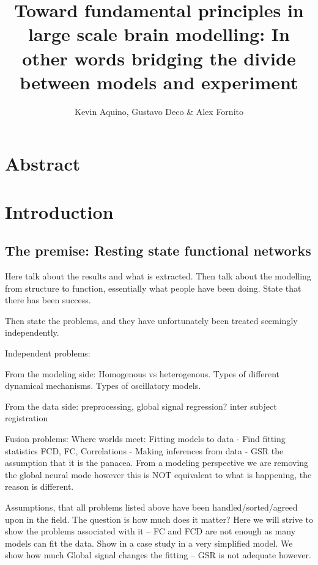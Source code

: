 \documentclass[10pt]{article}
\begin{document}
\title{Toward fundamental principles in large scale brain modelling: In other words bridging the divide between models and experiment}
\author{Kevin Aquino, Gustavo Deco \& Alex Fornito}
\maketitle

\section{Abstract}

\section{Introduction}

\subsection{The premise: Resting state functional networks}

Here talk about the results and what is extracted. Then talk about the modelling from structure to function, essentially what people have been doing. State that there has been success. 

Then state the problems, and they have unfortunately been treated seemingly independently.

Independent problems:

From the modeling side: Homogenous vs heterogenous. Types of different dynamical mechanisms. Types of oscillatory models.

From the data side: preprocessing, global signal regression? inter subject registration

Fusion problems:
Where worlds meet:
Fitting models to data
- Find fitting statistics FCD, FC, Correlations
- Making inferences from data
- GSR the assumption that it is the panacea. From a modeling perspective we are removing the global neural mode however this is NOT equivalent to what is happening, the reason is different. 

Assumptions, that all problems listed above have been handled/sorted/agreed upon in the field. The question is how much does it matter? Here we will strive to show the problems associated with it -- FC and FCD are not enough as many models can fit the data. Show in a case study in a very simplified model. We show how much Global signal changes the fitting -- GSR is not adequate however. 
\end{document}
